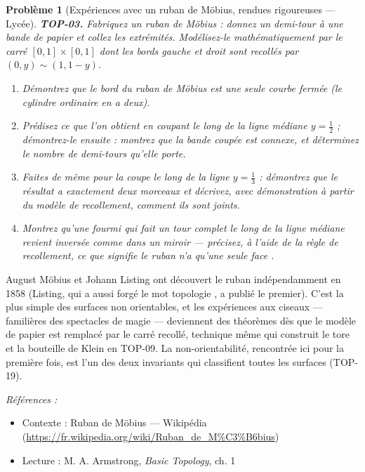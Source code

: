 \documentclass[11pt]{article}
\newtheorem{problem}{Problème}
\newenvironment{refs}{\par\small\noindent\emph{Références :}\begin{itemize}\setlength\itemsep{0pt}}{\end{itemize}\normalsize}
\begin{document}
\begin{problem}[{Expériences avec un ruban de Möbius, rendues rigoureuses --- Lycée}]
\textbf{TOP-03.} Fabriquez un ruban de Möbius : donnez un demi-tour à une bande de papier et collez
les extrémités. Modélisez-le mathématiquement par le carré $ [0,1] \times [0,1] $ dont les bords
gauche et droit sont recollés par $ (0, y) \sim (1, 1-y) $.
\begin{enumerate}
\item[(a)] Démontrez que le bord du ruban de Möbius est une seule courbe fermée (le cylindre ordinaire en a
deux).
\item[(b)] Prédisez ce que l'on obtient en coupant le long de la ligne médiane $ y = \tfrac12 $ ;
démontrez-le ensuite : montrez que la bande coupée est connexe, et déterminez le nombre de demi-tours
qu'elle porte.
\item[(c)] Faites de même pour la coupe le long de la ligne $ y = \tfrac13 $ : démontrez que le résultat a
exactement deux morceaux et décrivez, avec démonstration à partir du modèle de recollement, comment
ils sont joints.
\item[(d)] Montrez qu'une fourmi qui fait un tour complet le long de la ligne médiane revient inversée comme
dans un miroir --- précisez, à l'aide de la règle de recollement, ce que signifie \og{} le ruban n'a qu'une
seule face \fg{}.
\end{enumerate}

\end{problem}

\noindent August Möbius et Johann Listing ont découvert le ruban indépendamment en 1858
(Listing, qui a aussi forgé le mot \og{} topologie \fg{}, a publié le premier). C'est la plus simple des
surfaces non orientables, et les expériences aux ciseaux --- familières des spectacles de magie ---
deviennent des théorèmes dès que le modèle de papier est remplacé par le carré recollé, technique même
qui construit le tore et la bouteille de Klein en TOP-09. La non-orientabilité, rencontrée ici pour la
première fois, est l'un des deux invariants qui classifient toutes les surfaces (TOP-19).

\begin{refs}
\item Contexte : Ruban de Möbius --- Wikipédia (\url{https://fr.wikipedia.org/wiki/Ruban_de_M%C3%B6bius})
\item Lecture : M. A. Armstrong, \textit{Basic Topology}, ch. 1
\end{refs}
\end{document}
